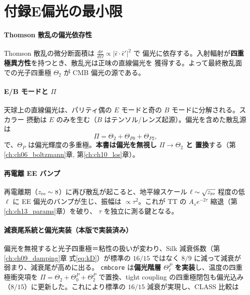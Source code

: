 \section*{付録E\quad 偏光の最小限}

\paragraph{Thomson 散乱の偏光依存性}
Thomson 散乱の微分断面積は $\frac{d\sigma}{d\Omega}\propto|\hat\epsilon\cdot\hat\epsilon'|^2$ で
偏光に依存する。入射輻射が\textbf{四重極異方性}を持つとき、散乱光は正味の直線偏光を
獲得する。よって最終散乱面での光子四重極 $\Theta_2$ が CMB 偏光の源である。

\paragraph{E/B モードと $\Pi$}
天球上の直線偏光は、パリティ偶の $E$ モードと奇の $B$ モードに分解される。スカラー
摂動は $E$ のみを生む（$B$ はテンソル/レンズ起源）。偏光を含めた散乱源は
\begin{equation}
  \Pi=\Theta_2+\Theta_{P0}+\Theta_{P2},
\end{equation}
で、$\Theta_{P}$ は偏光輝度の多重極。\textbf{本書は偏光を無視し $\Pi\to\Theta_2$ と
置換}する（第\ref{ch:ch06_boltzmann}章, 第\ref{ch:ch10_los}章）。

\paragraph{再電離 EE バンプ}
再電離期（$z_{\rm re}\sim8$）に再び散乱が起こると、地平線スケール
$\ell\sim\sqrt{z_{\rm re}}$ 程度の低 $\ell$ に EE 偏光のバンプが生じ、振幅は
$\propto\tau^2$。これが TT の $A_se^{-2\tau}$ 縮退（第\ref{ch:ch13_params}章）を破り、
$\tau$ を独立に測る鍵となる。

\paragraph{減衰尾系統と偏光実装（本版で実装済み）}
偏光を無視すると光子四重極＝粘性の扱いが変わり、Silk 減衰係数（第\ref{ch:ch09_damping}章
式\eqref{eq:kD}）が標準の $16/15$ ではなく $8/9$ に減って減衰が弱まり、減衰尾が高めに出る。
\texttt{cmbcore} は\textbf{偏光階層 $\Theta^P_\ell$ を実装}し、温度の四重極衝突項を
$\Pi=\Theta_2+\Theta^P_0+\Theta^P_2$ で置換、tight coupling の四重極閉包も偏光込み
（$8/15$）に更新した。これにより標準の $16/15$ 減衰が実現し、CLASS 比較は

